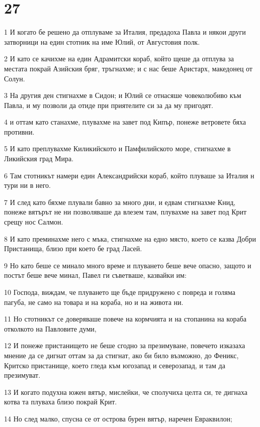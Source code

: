 \chapter{27}

\par 1 И когато бе решено да отплуваме за Италия, предадоха Павла и някои други затворници на един стотник на име Юлий, от Августовия полк.
\par 2 И като се качихме на един Адрамитски кораб, който щеше да отплува за местата покрай Азийския бряг, тръгнахме; и с нас беше Аристарх, македонец от Солун.
\par 3 На другия ден стигнахме в Сидон; и Юлий се отнасяше човеколюбиво към Павла, и му позволи да отиде при приятелите си за да му пригодят.
\par 4 и оттам като станахме, плувахме на завет под Кипър, понеже ветровете бяха противни.
\par 5 И като преплувахме Киликийското и Памфилийското море, стигнахме в Ликийския град Мира.
\par 6 Там стотникът намери един Александрийски кораб, който плуваше за Италия н тури ни в него.
\par 7 И след като бяхме плували бавно за много дни, и едвам стигнахме Книд, понеже вятърът не ни позволяваше да влезем там, плувахме на завет под Крит срещу нос Салмон.
\par 8 И като преминахме него с мъка, стигнахме на едно място, което се казва Добри Пристанища, близо при което бе град Ласей.
\par 9 Но като беше се минало много време и плуването беше вече опасно, защото и постът беше вече минал, Павел ги съветваше, казвайки им:
\par 10 Господа, виждам, че плуването ще бъде придружено с повреда и голяма пагуба, не само на товара и на кораба, но и на живота ни.
\par 11 Но стотникът се доверяваше повече на кормчията и на стопанина на кораба отколкото на Павловите думи,
\par 12 И понеже пристанището не беше сгодно за презимуване, повечето изказаха мнение да се дигнат оттам за да стигнат, ако би било възможно, до Феникс, Критско пристанище, което гледа към югозапад и северозапад, и там да презимуват.
\par 13 И когато подухна южен вятър, мислейки, че сполучиха целта си, те дигнаха котва та плуваха близо покрай Крит.
\par 14 Но след малко, спусна се от острова бурен вятър, наречен Евраквилон;
